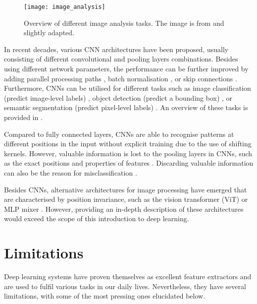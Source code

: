 \begin{figure}[h]
    \centering
    \texttt{[image: image\_analysis]}
    \caption[Overview of different image analysis tasks]{Overview of different image analysis tasks. The image is from  and slightly adapted.}
\end{figure}
In recent decades, various CNN architectures have been proposed, usually consisting of different convolutional and pooling layers combinations. Besides using different network parameters, the performance can be further improved by adding parallel processing paths , batch normalisation , or skip connections . Furthermore, CNNs can be utilised for different tasks such as image classification (predict image-level labels) \cite{schmarje_survey_2021}, object detection (predict a bounding box) \cite{zou_object_2023}, or semantic segmentation (predict pixel-level labels) \cite{asgari_taghanaki_deep_2021}. An overview of these tasks is provided in .

Compared to fully connected layers, CNNs are able to recognise patterns at different positions in the input without explicit training due to the use of shifting kernels. However, valuable information is lost to the pooling layers in CNNs, such as the exact positions and properties of features . Discarding valuable information can also be the reason for misclassification .

Besides CNNs, alternative architectures for image processing have emerged that are characterised by position invariance, such as the vision transformer (ViT) \cite{dosovitskiy_image_2021} or MLP mixer \cite{tolstikhin_mlp-mixer_2021}. However, providing an in-depth description of these architectures would exceed the scope of this introduction to deep learning.

\section{Limitations}
Deep learning systems have proven themselves as excellent feature extractors and are used to fulfil various tasks in our daily lives.
Nevertheless, they have several limitations, with some of the most pressing ones elucidated below.

